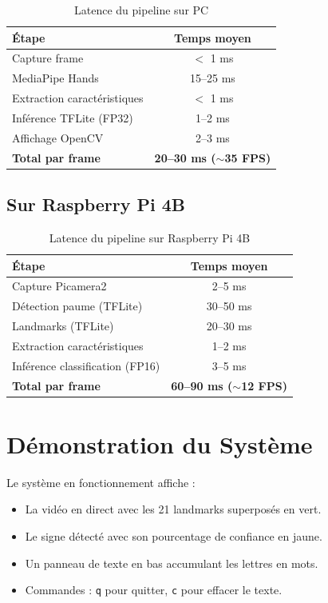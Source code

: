 \begin{table}[H]
    \centering
    \begin{tabular}{lc}
        \toprule
        \textbf{Étape} & \textbf{Temps moyen} \\
        \midrule
        Capture frame & $<$ 1 ms \\
        MediaPipe Hands & 15--25 ms \\
        Extraction caractéristiques & $<$ 1 ms \\
        Inférence TFLite (FP32) & 1--2 ms \\
        Affichage OpenCV & 2--3 ms \\
        \midrule
        \textbf{Total par frame} & \textbf{20--30 ms ($\sim$35 FPS)} \\
        \bottomrule
    \end{tabular}
    \caption{Latence du pipeline sur PC}
\end{table}

\subsection{Sur Raspberry Pi 4B}

\begin{table}[H]
    \centering
    \begin{tabular}{lc}
        \toprule
        \textbf{Étape} & \textbf{Temps moyen} \\
        \midrule
        Capture Picamera2 & 2--5 ms \\
        Détection paume (TFLite) & 30--50 ms \\
        Landmarks (TFLite) & 20--30 ms \\
        Extraction caractéristiques & 1--2 ms \\
        Inférence classification (FP16) & 3--5 ms \\
        \midrule
        \textbf{Total par frame} & \textbf{60--90 ms ($\sim$12 FPS)} \\
        \bottomrule
    \end{tabular}
    \caption{Latence du pipeline sur Raspberry Pi 4B}
\end{table}

\section{Démonstration du Système}

Le système en fonctionnement affiche :
\begin{itemize}
    \item La vidéo en direct avec les 21 landmarks superposés en vert.
    \item Le signe détecté avec son pourcentage de confiance en jaune.
    \item Un panneau de texte en bas accumulant les lettres en mots.
    \item Commandes : \texttt{q} pour quitter, \texttt{c} pour effacer le texte.
\end{itemize}

